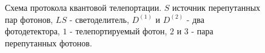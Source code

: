 \begin{figure}
\centering


\caption{Схема протокола квантовой телепортации. $S$ источник перепутанных пар фотонов, 
$LS$ - светоделитель, $D^{(1)}$ и $D^{(2)}$ - два фотодетектора, $1$ -
  телепортируемый фотон, $2$ и $3$ - пара перепутанных фотонов.}
\label{figTeleport}
\end{figure}
